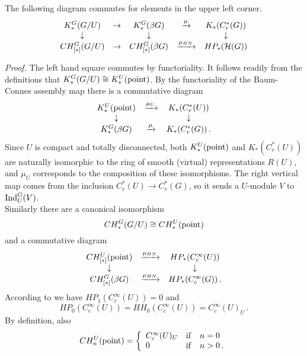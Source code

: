 \begin{lem}\label{lem:3.5} 
The following diagram commutes for elements in the upper left corner.
\[
\begin{array}{ccccc}
K_*^G (G/U) & \to & K_*^G (\beta G) & \xrightarrow{\mu} & K_* (C_r^* (G)) \\
\downarrow & &\downarrow & &\downarrow \\
CH^G_{[*]} (G/U) & \to & CH^G_{[*]} (\beta G) & 
\xrightarrow{\mu_{HN}} & HP_* (\mathcal H (G))
\end{array}
\]
\end{lem}
\emph{Proof.} 
The left hand square commutes by functoriality. It follows readily from the 
definitions that $K_*^G (G/U) \cong K_*^U (\mathrm{point})$. By the 
functoriality of the Baum-Connes assembly map there is a commutative diagram
\begin{equation}\label{eq:3.20}
\begin{array}{ccc}
K_*^U (\mathrm{point}) &\xrightarrow{\mu_U} & K_* (C_r^* (U)) \\
\downarrow & & \downarrow \\
K_*^G (\beta G) & \xrightarrow{\mu} & K_* (C_r^* (G)) \,.
\end{array}
\end{equation}
Since $U$ is compact and totally disconnected, both $K_*^U (\mathrm{point})$ 
and $K_* (C_r^* (U))$ are naturally isomorphic to the ring of smooth (virtual) 
representations $R (U)$, and $\mu_U$ corresponds to the composition 
of these isomorphisms. The right vertical map comes from the inclusion 
$C_r^* (U) \to C_r^* (G)$, so it sends a $U$-module $V$ to $\mathrm{Ind}_U^G (V)$.\\ 
Similarly there are a canonical isomorphism 
\[
CH_*^G (G/U) \cong CH_*^U (\mathrm{point})
\]
and a commutative diagram
\begin{equation}\label{eq:3.21}
\begin{array}{ccc}
CH_{[*]}^U (\mathrm{point}) &\xrightarrow{\mu_{HN}} & HP_* (C_c^\infty (U)) \\
\downarrow & & \downarrow \\
CH_{[*]}^G (\beta G) & \xrightarrow{\mu_{HN}} & HP_* (C_c^\infty (G)) \,.
\end{array}
\end{equation}
According to \cite[Section 4]{HiNi} we have $HP_1 (C_c^\infty (U)) = 0$ and
\[
HP_0 (C_c^\infty (U)) = HH_0 (C_c^\infty (U)) = C_c^\infty (U)_U \,.
\]
By definition, also
\[
CH_n^U (\mathrm{point}) = \left\{ \begin{array}{lll}
C_c^\infty (U)_U & \mathrm{if} & n = 0 \\
0 & \mathrm{if} & n > 0 \,.
\end{array} \right.
\]
